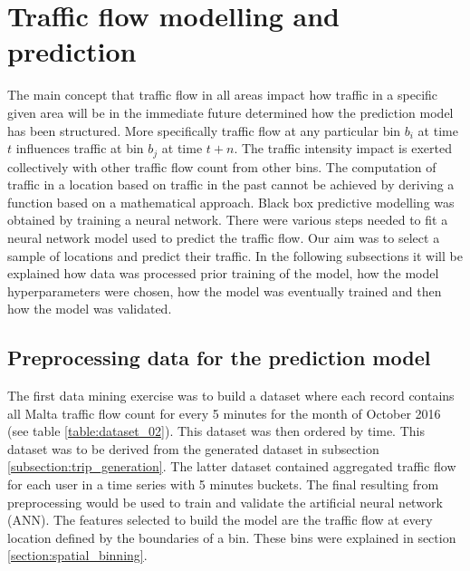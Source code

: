 \documentclass[12pt, a4paper]{report}
\theoremstyle{definition}
\theoremstyle{definition}%
\theoremstyle{definition}%
\theoremstyle{definition}%
\theoremstyle{definition}%
\theoremstyle{definition}%
\begin{document}
\section{Traffic flow modelling and prediction}


The main concept that traffic flow in all areas impact how traffic in a specific given area will be in the immediate future determined how the prediction model has been structured. More specifically traffic flow at any particular bin $b_i$ at time $t$ influences traffic at bin $b_j$ at time $t + n$. The traffic intensity impact is exerted collectively with other traffic flow count from other bins. The computation of traffic in a location based on traffic in the past cannot be achieved by deriving a function based on a mathematical approach. Black box predictive modelling was obtained by training a neural network. There were various steps needed to fit a neural network model used to predict the traffic flow. Our aim was to select a sample of locations and predict their traffic. In the following subsections it will be explained how data was processed prior training of the model, how the model hyperparameters were chosen, how the model was eventually trained and then how the model was validated.



\subsection{Preprocessing data for the prediction model} \label{subsection:Preprocessing data for the prediction model}
The first data mining exercise was to build a dataset where each record contains all Malta traffic flow count for every 5 minutes for the month of October 2016 (see table \ref{table:dataset_02}). This dataset was then ordered by time. This dataset was to be derived from the generated dataset in subsection \ref{subsection:trip_generation}. The latter dataset contained aggregated traffic flow for each user in a time series with 5 minutes buckets. The final resulting from preprocessing would be used to train and validate the artificial neural network (ANN). The features selected to build the model are the traffic flow at every location defined by the boundaries of a bin. These bins were explained in section \ref{section:spatial_binning}.
\end{document}

